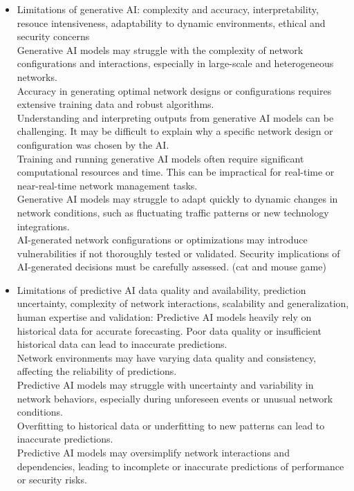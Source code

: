 \documentclass{article}
\begin{document}
\begin{itemize}
	\item[] Limitations of generative AI: complexity and accuracy, interpretability, resouce intensiveness, adaptability to dynamic environments, ethical and security concerns\\
		Generative AI models may struggle with the complexity of network configurations and interactions, especially in large-scale and heterogeneous networks.\\
		Accuracy in generating optimal network designs or configurations requires extensive training data and robust algorithms.\\
		Understanding and interpreting outputs from generative AI models can be challenging. It may be difficult to explain why a specific network design or configuration was chosen by the AI.\\
		Training and running generative AI models often require significant computational resources and time. This can be impractical for real-time or near-real-time network management tasks.\\
		Generative AI models may struggle to adapt quickly to dynamic changes in network conditions, such as fluctuating traffic patterns or new technology integrations.\\
		AI-generated network configurations or optimizations may introduce vulnerabilities if not thoroughly tested or validated. Security implications of AI-generated decisions must be carefully assessed. (cat and mouse game)
	\item[] Limitations of  predictive AI data quality and availability, prediction uncertainty, complexity of network interactions, scalability and generalization, human expertise and validation:
		Predictive AI models heavily rely on historical data for accurate forecasting. Poor data quality or insufficient historical data can lead to inaccurate predictions.\\
		Network environments may have varying data quality and consistency, affecting the reliability of predictions.\\
		Predictive AI models may struggle with uncertainty and variability in network behaviors, especially during unforeseen events or unusual network conditions.\\
		Overfitting to historical data or underfitting to new patterns can lead to inaccurate predictions.\\
		Predictive AI models may oversimplify network interactions and dependencies, leading to incomplete or inaccurate predictions of performance or security risks.\\

\end{itemize}
\end{document}
